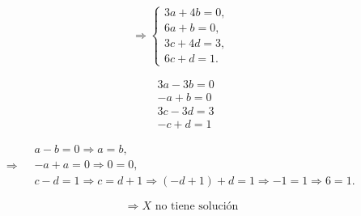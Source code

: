 \documentclass[a4paper,12pt]{article}
\begin{document}
\begin{ejercicio}[title=Ejercicio 19]
\[
\Rightarrow
\begin{cases}
3a+4b = 0,\\[2pt]
6a+b = 0,\\[2pt]
3c+4d = 3,\\[2pt]
6c+d = 1.
\end{cases}
\]
\end{ejercicio}
\begin{ejercicio}[title=Ejercicio 19]
\[
\begin{aligned}
&3a-3b = 0\\
&-a+b = 0\\
&3c-3d = 3\\
&-c+d = 1
\end{aligned}
\]

\[
\Rightarrow
\begin{aligned}
& a-b = 0 \Rightarrow a = b,\\
& -a+a = 0 \Rightarrow 0 = 0,\\
& c-d = 1 \Rightarrow c = d+1 \Rightarrow (-d+1)+d = 1 \Rightarrow -1 = 1 \Rightarrow 6 = 1.
\end{aligned}
\]

\[
\Rightarrow \boxed{\text{$X$ no tiene solución}}
\]
\end{ejercicio}
\end{document}
